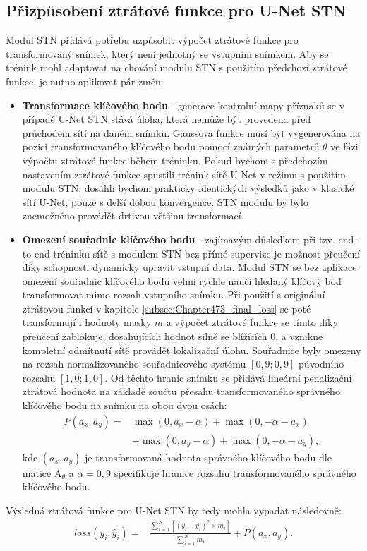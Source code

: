 \subsection{Přizpůsobení ztrátové funkce pro U-Net STN}
Modul STN přidává potřebu uzpůsobit výpočet ztrátové funkce pro transformovaný snímek, který není jednotný se vstupním snímkem. Aby se trénink mohl adaptovat na chování modulu STN s použitím předchozí ztrátové funkce, je nutno aplikovat pár změn:
\begin{itemize}
    \item \textbf{Transformace klíčového bodu} - generace kontrolní mapy příznaků se v případě U-Net STN stává úloha, která nemůže být provedena před průchodem sítí na daném snímku. Gaussova funkce musí být vygenerována na pozici transformovaného klíčového bodu pomocí známých parametrů $\theta$ ve fázi výpočtu ztrátové funkce během tréninku. Pokud bychom s předchozím nastavením ztrátové funkce spustili trénink sítě U-Net v režimu s použitím modulu STN, dosáhli bychom prakticky identických výsledků jako v klasické sítí U-Net, pouze s delší dobou konvergence. STN modulu by bylo znemožněno provádět drtivou většinu transformací.
    \item \textbf{Omezení souřadnic klíčového bodu} - zajímavým důsledkem při tzv. end-to-end tréninku sítě s modulem STN bez přímé supervize je možnost přeučení díky schopnosti dynamicky upravit vstupní data. Modul STN se bez aplikace omezení souřadnic klíčového bodu velmi rychle naučí hledaný klíčový bod transformovat mimo rozsah vstupního snímku. Při použití s originální ztrátovou funkcí v kapitole \ref{subsec:Chapter473_final_loss} se poté transformují i hodnoty masky $m$ a výpočet ztrátové funkce se tímto díky přeučení zablokuje, dosahujících hodnot silně se blížících 0, a vznikne kompletní odmítnutí sítě provádět lokalizační úlohu. Souřadnice byly omezeny na rozsah normalizovaného souřadnicového systému $[0,9; 0,9]$ původního rozsahu $[1,0; 1,0]$. Od těchto hranic snímku se přidává lineární penalizační ztrátová hodnota na základě součtu přesahu transformovaného správného klíčového bodu na snímku na obou dvou osách:
    \begin{equation}
    \begin{aligned}
    P(a_x, a_y) = & \max(0, a_x - \alpha) + \max(0, -\alpha - a_x) \\
                  & + \max(0, a_y - \alpha) + \max(0, -\alpha - a_y),
    \end{aligned}
    \end{equation}
    kde $(a_x, a_y)$ je transformovaná hodnota správného klíčového bodu dle matice ${\displaystyle \mathrm {A} }_\theta$ a $\alpha = 0,9$ specifikuje hranice rozsahu transformovaného správného klíčového bodu.
    
\end{itemize}

Výsledná ztrátová funkce pro U-Net STN by tedy mohla vypadat následovně:
\begin{equation}
\begin{aligned}
loss(y_i, \hat{y}_i) = & \frac{\sum_{i=1}^{N} [(y_i - \hat{y}_i)^2\times m_i]}{\sum_{i=1}^{N} m_i} + P(a_x, a_y).
\end{aligned}
\end{equation}

\endinput